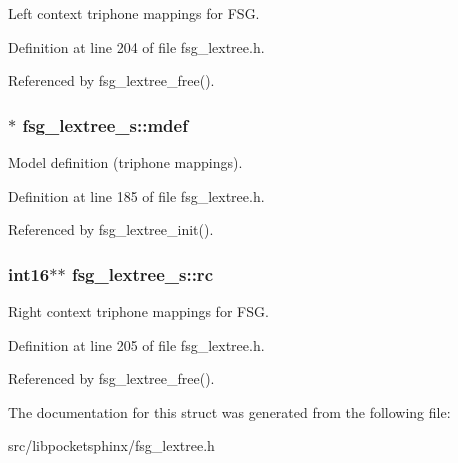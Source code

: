 Left context triphone mappings for F\-S\-G. 



Definition at line 204 of file fsg\-\_\-lextree.\-h.



Referenced by fsg\-\_\-lextree\-\_\-free().

\subsubsection[{mdef}]{$\ast$ fsg\-\_\-lextree\-\_\-s\-::mdef}\label{structfsg__lextree__s_ae2c059413a1cb4cda7068ab30a7a477c}


Model definition (triphone mappings). 



Definition at line 185 of file fsg\-\_\-lextree.\-h.



Referenced by fsg\-\_\-lextree\-\_\-init().

\subsubsection[{rc}]{\setlength{\rightskip}{0pt plus 5cm}int16$\ast$$\ast$ fsg\-\_\-lextree\-\_\-s\-::rc}\label{structfsg__lextree__s_a307d5351803d409aa51395333294c0f1}


Right context triphone mappings for F\-S\-G. 



Definition at line 205 of file fsg\-\_\-lextree.\-h.



Referenced by fsg\-\_\-lextree\-\_\-free().



The documentation for this struct was generated from the following file\-:\begin{DoxyCompactItemize}
\item 
src/libpocketsphinx/fsg\-\_\-lextree.\-h\end{DoxyCompactItemize}
